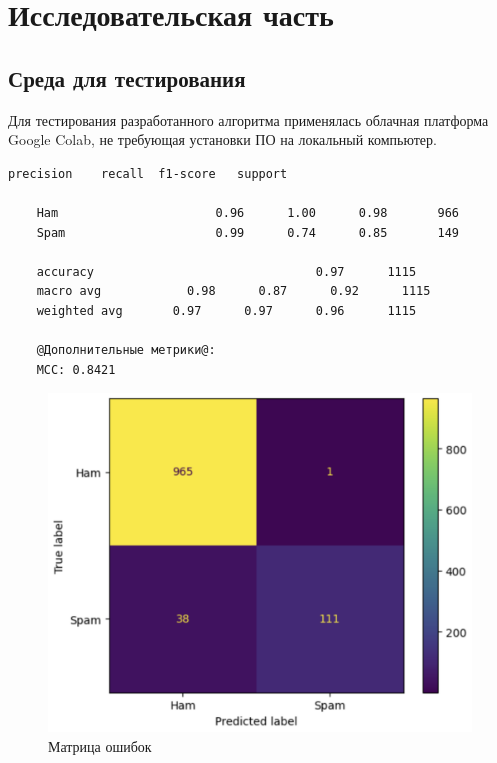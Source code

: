 \chapter{Исследовательская часть}

\section{Среда для тестирования}

Для тестирования разработанного алгоритма применялась облачная платформа Google Colab, не требующая установки ПО на локальный компьютер.

\begin{lstlisting}[label=lst:2,caption=Отчёт по результатам классификации]
	              precision    recall  f1-score   support
	
	Ham       				 0.96      1.00      0.98       966
	Spam       				 0.99      0.74      0.85       149
	
	accuracy                           	   0.97      1115
	macro avg       	 0.98      0.87      0.92      1115
	weighted avg       0.97      0.97      0.96      1115
	
	@Дополнительные метрики@:
	MCC: 0.8421
\end{lstlisting}

\begin{figure}
	\begin{center}
		\includegraphics[width=\textwidth]{images/1.png}
	\end{center}
	\caption{Матрица ошибок}
	\label{img:1}
\end{figure}

